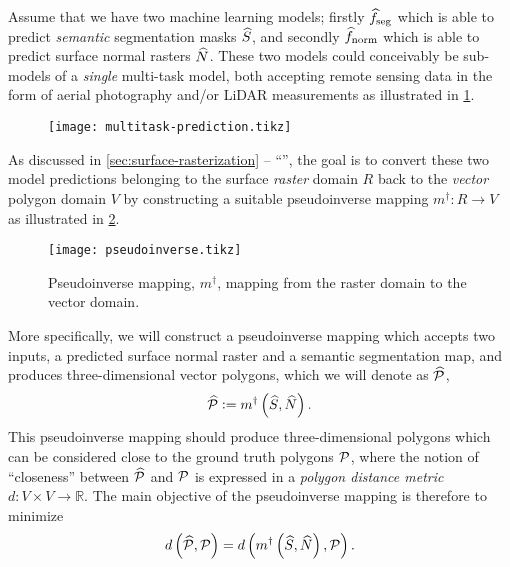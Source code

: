 Assume that we have two machine learning models; firstly $\widehat{f}_{\mathrm{seg}}$ which is able to predict \emph{semantic} segmentation masks $\widehat{S}$, and secondly $\widehat{f}_{\mathrm{norm}}$ which is able to predict surface normal rasters $\widehat{N}$.
These two models could conceivably be sub-models of a \emph{single} multi-task model, both accepting remote sensing data in the form of aerial photography and/or LiDAR measurements as illustrated in \cref{fig:multitask-prediction}.
\begin{figure}[H]
  \centering
  \texttt{[image: multitask-prediction.tikz]}
  \label{fig:multitask-prediction}
\end{figure}
\noindent
As discussed in \cref{sec:surface-rasterization} -- \enquote{}, the goal is to convert these two model predictions belonging to the surface \emph{raster} domain $R$ back to the \emph{vector} polygon domain $V$ by constructing a suitable pseudoinverse mapping $m^{\dagger}: R \rightarrow V$ as illustrated in \cref{fig:pseudoinverse}.
\begin{figure}[H]
  \centering
  \texttt{[image: pseudoinverse.tikz]}
  \caption{Pseudoinverse mapping, $m^{\dagger}$, mapping from the raster domain to the vector domain.}%
  \label{fig:pseudoinverse}
\end{figure}
\noindent
More specifically, we will construct a pseudoinverse mapping which accepts two inputs, a predicted surface normal raster and a semantic segmentation map, and produces three-dimensional vector polygons, which we will denote as $\widehat{\mathcal{P}}$,
\begin{equation*}
  \widehat{\mathcal{P}}
  \vcentcolon=
  m^{\dagger}\left(
    \widehat{S},
    \widehat{N}
  \right).
\end{equation*}
This pseudoinverse mapping should produce three-dimensional polygons which can be considered close to the ground truth polygons $\mathcal{P}$, where the notion of \enquote{closeness} between $\widehat{\mathcal{P}}$ and $\mathcal{P}$ is expressed in a \textit{polygon distance metric} $d: V \times V \rightarrow \mathbb{R}$.
The main objective of the pseudoinverse mapping is therefore to minimize
\begin{equation*}
  d\left(
    \widehat{\mathcal{P}},
    \mathcal{P}
  \right)
  =
  d\left(
    m^{\dagger}\left(\widehat{S}, \widehat{N}\right),
    \mathcal{P}
  \right).
\end{equation*}
